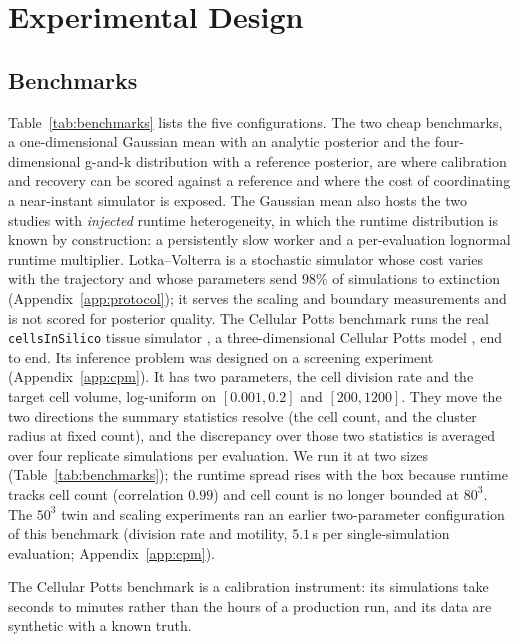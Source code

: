 \documentclass[pdflatex,sn-mathphys-num]{sn-jnl}
\theoremstyle{plain}
\theoremstyle{definition}
\begin{document}
\section{Experimental Design}\label{sec:experiments}

\subsection{Benchmarks}\label{sec:experiments-suite}
Table~\ref{tab:benchmarks} lists the five configurations. The two cheap benchmarks, a one-dimensional Gaussian mean with an analytic posterior and the four-dimensional g-and-k distribution \cite{rayner2002gk} with a reference posterior, are where calibration and recovery can be scored against a reference and where the cost of coordinating a near-instant simulator is exposed. The Gaussian mean also hosts the two studies with \emph{injected} runtime heterogeneity, in which the runtime distribution is known by construction: a persistently slow worker and a per-evaluation lognormal runtime multiplier. Lotka--Volterra is a stochastic simulator whose cost varies with the trajectory and whose parameters send $98\%$ of simulations to extinction (Appendix~\ref{app:protocol}); it serves the scaling and boundary measurements and is not scored for posterior quality. The Cellular Potts benchmark runs the real \texttt{cellsInSilico} tissue simulator \cite{berghoff2020cis}, a three-dimensional Cellular Potts model \cite{graner1992cpm}, end to end. Its inference problem was designed on a screening experiment (Appendix~\ref{app:cpm}). It has two parameters, the cell division rate and the target cell volume, log-uniform on $[0.001,0.2]$ and $[200,1200]$. They move the two directions the summary statistics resolve (the cell count, and the cluster radius at fixed count), and the discrepancy over those two statistics is averaged over four replicate simulations per evaluation. We run it at two sizes (Table~\ref{tab:benchmarks}); the runtime spread rises with the box because runtime tracks cell count (correlation $0.99$) and cell count is no longer bounded at $80^3$. The $50^3$ twin and scaling experiments ran an earlier two-parameter configuration of this benchmark (division rate and motility, $5.1$\,s per single-simulation evaluation; Appendix~\ref{app:cpm}).

The Cellular Potts benchmark is a calibration instrument: its simulations take seconds to minutes rather than the hours of a production run, and its data are synthetic with a known truth.
\end{document}
